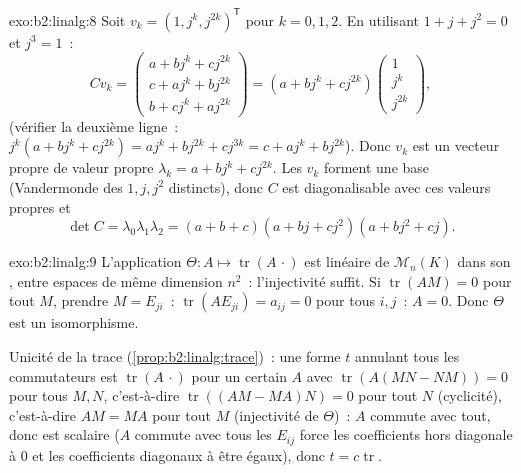 \begin{solution}{exo:b2:linalg:8}
Soit $v_k = (1, j^k, j^{2k})^{\mathsf T}$ pour $k = 0, 1, 2$. En utilisant $1
+ j + j^2 = 0$ et $j^3 = 1$~:
\[
C v_k =
\begin{pmatrix}
a + b j^k + c j^{2k}\\
c + a j^k + b j^{2k}\\
b + c j^k + a j^{2k}
\end{pmatrix}
= (a + b j^k + c j^{2k})
\begin{pmatrix} 1\\ j^k\\ j^{2k}\end{pmatrix},
\]
(vérifier la deuxième ligne~: $j^k(a + bj^k + cj^{2k}) = aj^k + bj^{2k} +
cj^{3k} = c + aj^k + bj^{2k}$). Donc $v_k$ est un vecteur propre de
valeur propre $\lambda_k = a + bj^k + cj^{2k}$. Les $v_k$ forment une base
(Vandermonde des $1, j, j^2$ distincts), donc $C$ est diagonalisable
avec ces valeurs propres et
\[
\det C = \lambda_0\lambda_1\lambda_2
= (a+b+c)(a + bj + cj^2)(a + bj^2 + cj).
\]
\end{solution}

\begin{solution}{exo:b2:linalg:9}
L'application $\Theta \colon A \mapsto \operatorname{tr}(A\,\cdot)$ est
linéaire de $\mathcal{M}_n(K)$ dans son , entre espaces de même
dimension $n^2$~: l'injectivité suffit. Si $\operatorname{tr}(AM) =
0$ pour tout $M$, prendre $M = E_{ji}$~: $\operatorname{tr}(A E_{ji}) =
a_{ij} = 0$ pour tous $i, j$~: $A = 0$. Donc $\Theta$ est un isomorphisme.

Unicité de la trace (\cref{prop:b2:linalg:trace})~: une forme $t$
annulant tous les commutateurs est $\operatorname{tr}(A\,\cdot)$ pour un
certain $A$ avec $\operatorname{tr}(A(MN - NM)) = 0$ pour tous $M, N$,
c'est-à-dire $\operatorname{tr}((AM - MA)N) = 0$ pour tout $N$ (cyclicité),
c'est-à-dire $AM = MA$ pour tout $M$ (injectivité de $\Theta$)~: $A$ commute
avec tout, donc est scalaire ($A$ commute avec tous les $E_{ij}$ force
les coefficients hors diagonale à $0$ et les coefficients diagonaux à
être égaux), donc $t = c \operatorname{tr}$.
\end{solution}

